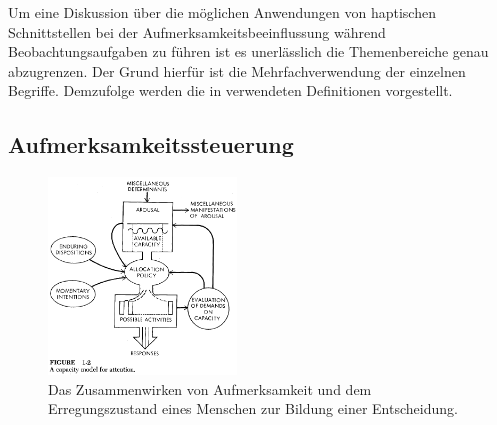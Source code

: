 \documentclass{llncs}					%
\begin{document}
Um eine Diskussion über die möglichen Anwendungen von haptischen Schnittstellen bei der Aufmerksamkeitsbeeinflussung während Beobachtungsaufgaben zu führen ist es unerlässlich die Themenbereiche genau abzugrenzen. Der Grund hierfür ist die Mehrfachverwendung der einzelnen Begriffe. Demzufolge werden die in verwendeten Definitionen vorgestellt.

\subsection{Aufmerksamkeitssteuerung}

\begin{figure}[htbp]
	\begin{center}
		\includegraphics[width = 5cm]{Grafiken/28-Attention-Model.png}
		\caption{Das Zusammenwirken von Aufmerksamkeit und dem Erregungszustand eines Menschen zur Bildung einer Entscheidung\cite{kahneman1973attention}.}
		\label{28-Attention-Model}
	\end{center}
\end{figure}
\end{document}
